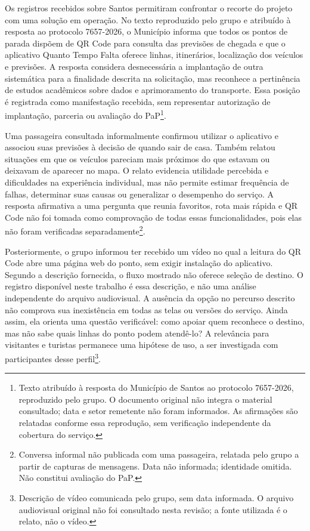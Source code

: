 \documentclass[12pt,oneside,a4paper,brazil,chapter=TITLE]{abntex2}
\begin{document}
Os registros recebidos sobre Santos permitiram confrontar o recorte do projeto com uma solução em operação. No texto reproduzido pelo grupo e atribuído à resposta ao protocolo 7657-2026, o Município informa que todos os pontos de parada dispõem de QR Code para consulta das previsões de chegada e que o aplicativo Quanto Tempo Falta oferece linhas, itinerários, localização dos veículos e previsões. A resposta considera desnecessária a implantação de outra sistemática para a finalidade descrita na solicitação, mas reconhece a pertinência de estudos acadêmicos sobre dados e aprimoramento do transporte. Essa posição é registrada como manifestação recebida, sem representar autorização de implantação, parceria ou avaliação do PaP\footnote{Texto atribuído à resposta do Município de Santos ao protocolo 7657-2026, reproduzido pelo grupo. O documento original não integra o material consultado; data e setor remetente não foram informados. As afirmações são relatadas conforme essa reprodução, sem verificação independente da cobertura do serviço.}.

Uma passageira consultada informalmente confirmou utilizar o aplicativo e associou suas previsões à decisão de quando sair de casa. Também relatou situações em que os veículos pareciam mais próximos do que estavam ou deixavam de aparecer no mapa. O relato evidencia utilidade percebida e dificuldades na experiência individual, mas não permite estimar frequência de falhas, determinar suas causas ou generalizar o desempenho do serviço. A resposta afirmativa a uma pergunta que reunia favoritos, rota mais rápida e QR Code não foi tomada como comprovação de todas essas funcionalidades, pois elas não foram verificadas separadamente\footnote{Conversa informal não publicada com uma passageira, relatada pelo grupo a partir de capturas de mensagens. Data não informada; identidade omitida. Não constitui avaliação do PaP.}.

Posteriormente, o grupo informou ter recebido um vídeo no qual a leitura do QR Code abre uma página web do ponto, sem exigir instalação do aplicativo. Segundo a descrição fornecida, o fluxo mostrado não oferece seleção de destino. O registro disponível neste trabalho é essa descrição, e não uma análise independente do arquivo audiovisual. A ausência da opção no percurso descrito não comprova sua inexistência em todas as telas ou versões do serviço. Ainda assim, ela orienta uma questão verificável: como apoiar quem reconhece o destino, mas não sabe quais linhas do ponto podem atendê-lo? A relevância para visitantes e turistas permanece uma hipótese de uso, a ser investigada com participantes desse perfil\footnote{Descrição de vídeo comunicada pelo grupo, sem data informada. O arquivo audiovisual original não foi consultado nesta revisão; a fonte utilizada é o relato, não o vídeo.}.
\end{document}
